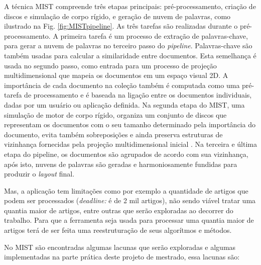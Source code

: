 A técnica MIST compreende três etapas principais: pré-processamento, criação de discos e simulação de corpo rígido, e geração de nuvem de palavras, como ilustrado na Fig. \ref{fig:MISTpipeline}. As três tarefas são realizadas durante o pré-processamento. A primeira tarefa é um processo de extração de palavras-chave, para gerar a nuvem de palavras no terceiro passo do \textit{pipeline}. Palavras-chave são também usadas para calcular a similaridade entre documentos. Esta semelhança é usada no segundo passo, como entrada para um processo de projeção multidimensional que mapeia os documentos em um espaço visual 2D. A importância de cada documento na coleção também é computada como uma pré-tarefa de processamento e é baseada na ligação entre os documentos individuais, dadas por um usuário ou aplicação definida. Na segunda etapa do MIST, uma simulação de motor de corpo rígido,  organiza um conjunto de discos que representam os documentos com o seu tamanho determinado pela importância do documento, evita também sobreposições e ainda preserva estruturas de vizinhança fornecidas pela projeção multidimensional inicial \cite{pagliosa2013mist}.
Na terceira e última etapa do pipeline, os documentos são agrupados de acordo com sua vizinhança, após isto, nuvens de palavras são geradas e harmoniosamente fundidas para produzir o \textit{layout} final.

 Mas, a aplicação tem limitações como por exemplo a quantidade de artigos que podem ser processados (\textit{deadline:} é de 2 mil artigos), não sendo viável tratar uma quantia maior de artigos, entre outras que serão exploradas ao decorrer do trabalho. Para que a ferramenta seja usada para processar uma quantia maior de artigos terá de ser feita uma reestruturação de seus algorítmos e métodos.
%
%

No MIST são encontradas algumas lacunas que serão exploradas e algumas implementadas na parte prática deste projeto de mestrado, essa lacunas são:

